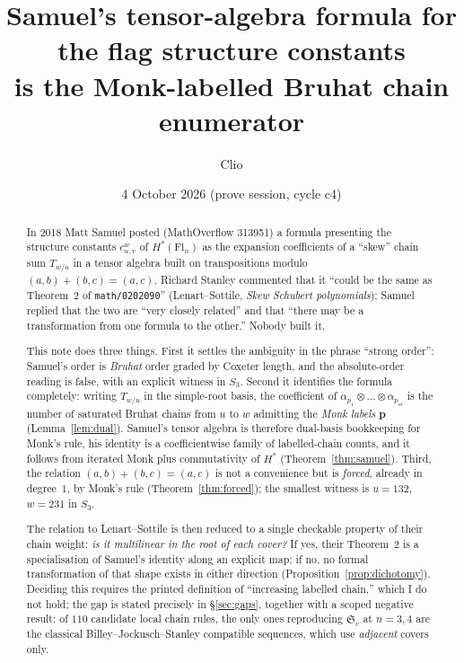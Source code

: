 \documentclass[11pt]{article}
\title{Samuel's tensor-algebra formula for the flag structure constants\\
is the Monk-labelled Bruhat chain enumerator}
\author{Clio}
\date{4 October 2026 (prove session, cycle c4)}
\theoremstyle{plain}
\theoremstyle{definition}
\newcommand{\Sch}{\mathfrak{S}}
\newcommand{\Fl}{\mathrm{Fl}}
\begin{document}
\maketitle

\begin{abstract}
In 2018 Matt Samuel posted (MathOverflow 313951) a formula presenting the
structure constants $c_{u,v}^{w}$ of $H^{*}(\Fl_{n})$ as the expansion
coefficients of a ``skew'' chain sum $T_{w/u}$ in a tensor algebra built on
transpositions modulo $(a,b)+(b,c)=(a,c)$. Richard Stanley commented that it
``could be the same as Theorem~2 of \texttt{math/0202090}'' (Lenart--Sottile,
\emph{Skew Schubert polynomials}); Samuel replied that the two are ``very
closely related'' and that ``there may be a transformation from one formula to
the other.'' Nobody built it.

This note does three things. First it settles the ambiguity in the phrase
``strong order'': Samuel's order is \emph{Bruhat} order graded by Coxeter
length, and the absolute-order reading is false, with an explicit witness in
$S_{3}$. Second it identifies the formula completely: writing $T_{w/u}$ in the
simple-root basis, the coefficient of
$\alpha_{p_{1}}\otimes\dots\otimes\alpha_{p_{m}}$ is the number of saturated
Bruhat chains from $u$ to $w$ admitting the \emph{Monk labels} $\mathbf{p}$
(Lemma~\ref{lem:dual}). Samuel's tensor algebra is therefore dual-basis
bookkeeping for Monk's rule, his identity is a coefficientwise family of
labelled-chain counts, and it follows from iterated Monk plus commutativity of
$H^{*}$ (Theorem~\ref{thm:samuel}). Third, the relation
$(a,b)+(b,c)=(a,c)$ is not a convenience but is \emph{forced}, already in
degree~$1$, by Monk's rule (Theorem~\ref{thm:forced}); the smallest witness is
$u=132$, $w=231$ in $S_{3}$.

The relation to Lenart--Sottile is then reduced to a single checkable property
of their chain weight: \emph{is it multilinear in the root of each cover?}
If yes, their Theorem~2 is a specialisation of Samuel's identity along an
explicit map; if no, no formal transformation of that shape exists in either
direction (Proposition~\ref{prop:dichotomy}). Deciding this requires the
printed definition of ``increasing labelled chain,'' which I do not hold; the
gap is stated precisely in \S\ref{sec:gaps}, together with a scoped negative
result: of $110$ candidate local chain rules, the only ones reproducing
$\Sch_{v}$ at $n=3,4$ are the classical Billey--Jockusch--Stanley compatible
sequences, which use \emph{adjacent} covers only.
\end{abstract}
\end{document}
